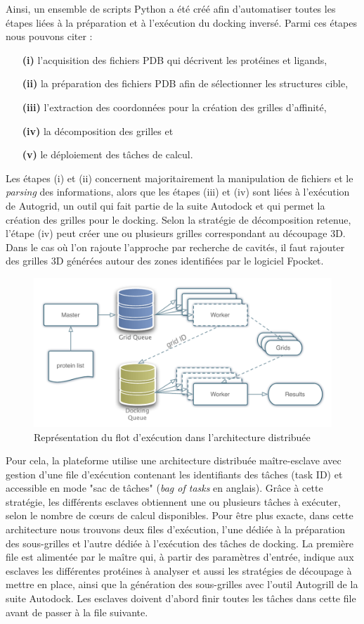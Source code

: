 Ainsi, un ensemble de scripts Python a été créé afin d'automatiser toutes les étapes liées à la préparation et à l'exécution du docking inversé. Parmi ces étapes nous pouvons citer :
\begin{itemize}
	\item[\textbf{(i)}] l'acquisition des fichiers PDB qui décrivent les protéines et ligands, 
	\item[\textbf{(ii)}] la préparation des fichiers PDB afin de sélectionner les structures cible, 
	\item[\textbf{(iii)}] l'extraction des coordonnées pour la création des grilles d'affinité, 
	\item[\textbf{(iv)}] la décomposition des grilles et 
	\item[\textbf{(v)}] le déploiement des tâches de calcul. 
\end{itemize}

Les étapes (i) et (ii) concernent majoritairement la manipulation de fichiers et le \textit{parsing} des informations, alors que les étapes  (iii) et (iv) sont liées à l'exécution de Autogrid, un outil qui fait partie de la suite Autodock et qui permet la création des grilles pour le docking. Selon la stratégie de décomposition retenue, l'étape (iv) peut créer une ou plusieurs grilles correspondant au découpage 3D. Dans le cas où l'on rajoute l'approche par recherche de cavités, il faut rajouter des grilles 3D générées  autour des zones identifiées par le logiciel Fpocket. 


\begin{figure}
	\centering
		\includegraphics[width=0.5\linewidth]{images/Romain/fig3-color}
	\caption{Représentation du flot d'exécution dans l'architecture distribuée}\label{fig:romain-fig3}
\end{figure}


Pour cela, la plateforme utilise une architecture distribuée maître-esclave avec gestion d'une file d'exécution contenant les identifiants des tâches (task ID) et accessible en mode "sac de tâches" (\textit{bag of tasks} en anglais). Grâce à cette stratégie, les différents esclaves obtiennent une ou plusieurs tâches à exécuter, selon le nombre de c{\oe}urs de calcul disponibles. Pour être plus exacte, dans cette architecture nous trouvons deux files d'exécution, l'une dédiée à la préparation des sous-grilles et l'autre dédiée à l'exécution des tâches de docking. La première file est alimentée par le maître qui, à partir des paramètres d'entrée, indique aux esclaves les différentes protéines à analyser et aussi les stratégies de découpage à mettre en place, ainsi que la génération des sous-grilles avec l'outil Autogrill de la suite Autodock. Les esclaves doivent d'abord finir toutes les tâches dans cette file avant de passer à la file suivante.

